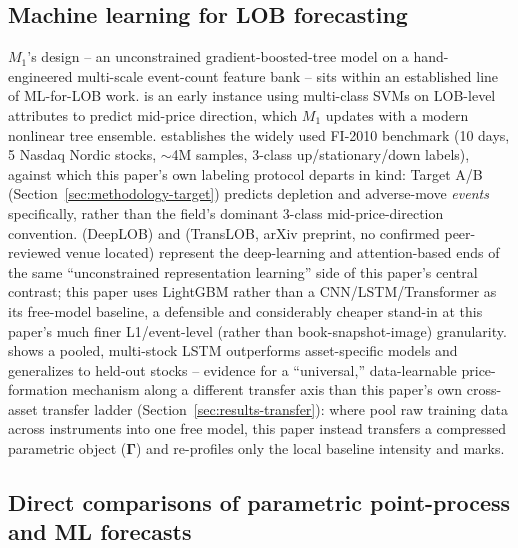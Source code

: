 \subsection{Machine learning for LOB forecasting}
\label{sec:rw-ml}

$M_1$'s design -- an unconstrained gradient-boosted-tree model on a
hand-engineered multi-scale event-count feature bank -- sits within an
established line of ML-for-LOB work. \citet{kercheval2015modelling} is an
early instance using multi-class SVMs on LOB-level attributes to predict
mid-price direction, which $M_1$ updates with a modern nonlinear tree
ensemble. \citet{ntakaris2018benchmark} establishes the widely used
FI-2010 benchmark (10 days, 5 Nasdaq Nordic stocks, $\sim$4M samples,
3-class up/stationary/down labels), against which this paper's own
labeling protocol departs in kind: Target A/B
(Section~\ref{sec:methodology-target}) predicts depletion and
adverse-move \emph{events} specifically, rather than the field's dominant
3-class mid-price-direction convention. \citet{zhang2019deeplob} (DeepLOB)
and \citet{wallbridge2020translob} (TransLOB, arXiv preprint, no
confirmed peer-reviewed venue located) represent the deep-learning and
attention-based ends of the same ``unconstrained representation
learning'' side of this paper's central contrast; this paper uses
LightGBM rather than a CNN/LSTM/Transformer as its free-model baseline, a
defensible and considerably cheaper stand-in at this paper's much finer
L1/event-level (rather than book-snapshot-image) granularity.
\citet{sirignano2019universal} shows a pooled, multi-stock LSTM
outperforms asset-specific models and generalizes to held-out stocks --
evidence for a ``universal,'' data-learnable price-formation mechanism
along a different transfer axis than this paper's own cross-asset
transfer ladder (Section~\ref{sec:results-transfer}): where
\citeauthor{sirignano2019universal} pool raw training data across
instruments into one free model, this paper instead transfers a
compressed parametric object ($\boldsymbol\Gamma$) and re-profiles only
the local baseline intensity and marks.

\subsection{Direct comparisons of parametric point-process and ML forecasts}
\label{sec:rw-comparison}

